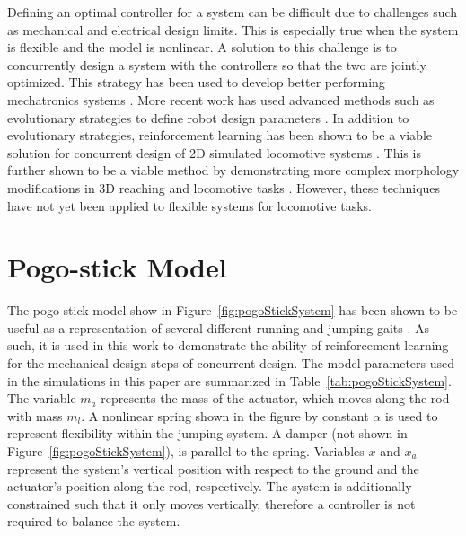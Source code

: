 \documentclass[letterpaper, 10 pt, conference]{ieeeconf}  %
\begin{document}
Defining an optimal controller for a system can be difficult due to challenges such as mechanical and electrical design limits. This is especially true when the system is flexible and the model is nonlinear. A solution to this challenge is to concurrently design a system with the controllers so that the two are jointly optimized. This strategy has been used to develop better performing mechatronics systems \cite{Li2001}.  More recent work has used advanced methods such as evolutionary strategies to define robot design parameters \cite{Wang2019}. In addition to evolutionary strategies, reinforcement learning has been shown to be a viable solution for concurrent design of 2D simulated locomotive systems \cite{Ha2019j}. This is further shown to be a viable method by demonstrating more complex morphology modifications in 3D reaching and locomotive tasks \cite{Schaff2019e}. However, these techniques have not yet been applied to flexible systems for locomotive tasks. 

\section{Pogo-stick Model}
\label{sec:pogo_model}

The pogo-stick model show in Figure~\ref{fig:pogoStickSystem} has been shown to be useful as a representation of several different running and jumping gaits \cite{Blickhan1993a}. As such, it is used in this work to demonstrate the ability of reinforcement learning for the mechanical design steps of concurrent design. The model parameters used in the simulations in this paper are summarized in Table~\ref{tab:pogoStickSystem}.
%
The variable $m_a$ represents the mass of the actuator, which moves along the rod with mass $m_l$. A nonlinear spring shown in the figure by constant $\alpha$ is used to represent flexibility within the jumping system. A damper (not shown in Figure~\ref{fig:pogoStickSystem}), is parallel to the spring. Variables $x$ and $x_a$ represent the system's vertical position with respect to the ground and the actuator's position along the rod, respectively. The system is additionally constrained such that it only moves vertically, therefore a controller is not required to balance the system.
	
\end{document}
